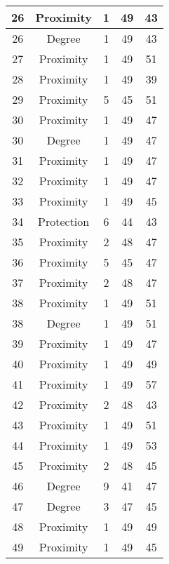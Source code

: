 \documentclass[results.tex]{subfiles}
\begin{document}
\begin{center}
\begin{tabular}{| c || c | c | c | c |}
    \hline
    26 & Proximity & 1 & 49 & 43 \\ 
    \hline
    26 & Degree & 1 & 49 & 43 \\ 
    \hline
    27 & Proximity & 1 & 49 & 51 \\ 
    \hline
    28 & Proximity & 1 & 49 & 39 \\ 
    \hline
    29 & Proximity & 5 & 45 & 51 \\ 
    \hline
    30 & Proximity & 1 & 49 & 47 \\ 
    \hline
    30 & Degree & 1 & 49 & 47 \\ 
    \hline
    31 & Proximity & 1 & 49 & 47 \\ 
    \hline
    32 & Proximity & 1 & 49 & 47 \\ 
    \hline
    33 & Proximity & 1 & 49 & 45 \\ 
    \hline
    34 & Protection & 6 & 44 & 43 \\ 
    \hline
    35 & Proximity & 2 & 48 & 47 \\ 
    \hline
    36 & Proximity & 5 & 45 & 47 \\ 
    \hline
    37 & Proximity & 2 & 48 & 47 \\ 
    \hline
    38 & Proximity & 1 & 49 & 51 \\ 
    \hline
    38 & Degree & 1 & 49 & 51 \\ 
    \hline
    39 & Proximity & 1 & 49 & 47 \\ 
    \hline
    40 & Proximity & 1 & 49 & 49 \\ 
    \hline
    41 & Proximity & 1 & 49 & 57 \\ 
    \hline
    42 & Proximity & 2 & 48 & 43 \\ 
    \hline
    43 & Proximity & 1 & 49 & 51 \\ 
    \hline
    44 & Proximity & 1 & 49 & 53 \\ 
    \hline
    45 & Proximity & 2 & 48 & 45 \\ 
    \hline
    46 & Degree & 9 & 41 & 47 \\ 
    \hline
    47 & Degree & 3 & 47 & 45 \\ 
    \hline
    48 & Proximity & 1 & 49 & 49 \\ 
    \hline
    49 & Proximity & 1 & 49 & 45 \\ 
    \hline   \end{tabular}
\end{center}
\end{document}
